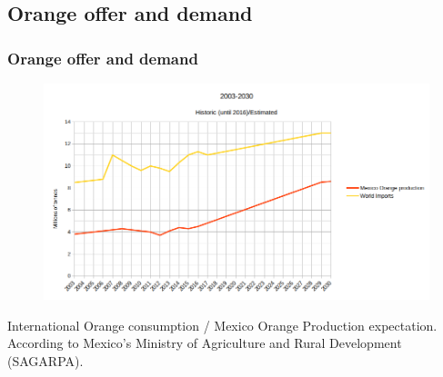 \documentclass[
serif,
compress,
xcolor=table,
dvipsnames,
]{beamer}
\begin{document}
\subsection{Orange offer and demand}
\begin{frame}
\frametitle{Orange offer and demand}

\begin{figure}[h]
    \centering
    \includegraphics[width=0.9\linewidth]{grap.png}
    \label{overview}
\end{figure}

\small
International Orange consumption / Mexico Orange Production expectation.
According to Mexico's Ministry of Agriculture and Rural Development (SAGARPA).

\end{frame}
\end{document}
